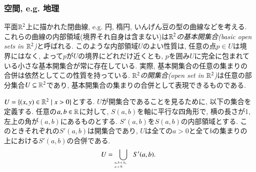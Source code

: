 
\subsubsection{空間, e.g. 地理}


平面${\mathbb R}^2$上に描かれた閉曲線, e.g. 円, 楕円, いんげん豆の型の曲線などを考える. これらの曲線の内部領域(境界それ自身は含まない)は\emph{${\mathbb R}^2$の基本開集合(basic open sets in ${\mathbb R}^2$)}と呼ばれる. このような内部領域$U$のよい性質は, 任意の点$p\in U$は境界にはなく, よって$p$が$U$の境界にどれだけ近くとも, $p$を囲み$U$に完全に包まれている小さな基本開集合が常に存在している. 実際, 基本開集合の任意の集まりの合併は依然としてこの性質を持っている. \emph{${\mathbb R}^2$の開集合(open set in ${\mathbb R}^2$)}は任意の部分集合$U\subseteq {\mathbb R}^2$であり, 基本開集合の集まりの合併として表現できるものである.

\begin{example}


$U=\{(x,y)\in{\mathbb R}^2{\;|\;}x>0\}$とする. $U$が開集合であることを見るために, 以下の集合を定義する. 任意の$a,b\in{\mathbb R}$に対して, $S(a,b)$を軸に平行な四角形で, 横の長さが1, 左上の角が$(a,b)$にあるものとする. $S'(a,b)$を$S(a,b)$の内部領域とする. このときそれぞれの$S'(a,b)$は開集合であり, $U$は全ての$a>0$と全て$b$の集まりの上における$S'(a,b)$の合併である. $$U=\bigcup_{\parbox{.35in}{\tiny$a,b\in\RR,\\~\;\;a>0$}}S'(a,b).$$

\end{example}

